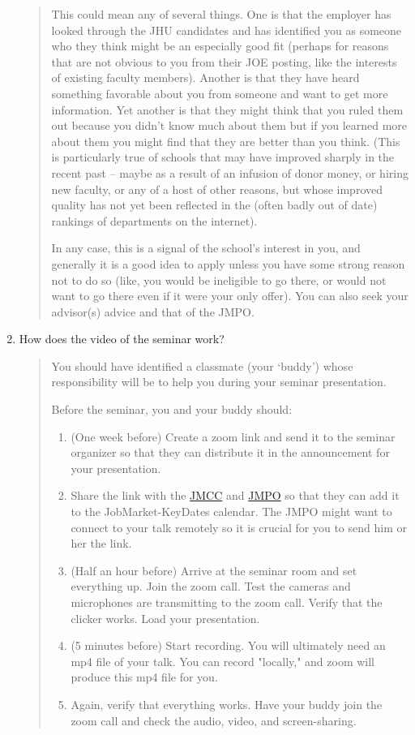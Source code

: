 \documentclass{\classes/econtex}
\begin{document}
\begin{enumerate}
  \begin{quote}
    This could mean any of several things.  One is that the employer has looked through the JHU candidates and has identified you as someone who they think might be an especially good fit (perhaps for reasons that are not obvious to you from their JOE posting, like the interests of existing faculty members).  Another is that they have heard something favorable about you from someone and want to get more information.  Yet another is that they might think that you ruled them out because you didn't know much about them but if you learned more about them you might find that they are better than you think.  (This is particularly true of schools that may have improved sharply in the recent past -- maybe as a result of an infusion of donor money, or hiring new faculty, or any of a host of other reasons, but whose improved quality has not yet been reflected in the (often badly out of date) rankings of departments on the internet).

    In any case, this is a signal of the school's interest in you, and generally it is a good idea to apply unless you have some strong reason not to do so (like, you would be ineligible to go there, or would not want to go there even if it were your only offer).  You can also seek your advisor(s) advice and that of the JMPO.


  \end{quote}

\hypertarget{record-and-post-your-job-talk}{}
\item  How does the video of the seminar work?
  
  \begin{quote}
    You should have identified a classmate (your `buddy') whose
    responsibility will be to help you during your seminar presentation.
    
    Before the seminar, you and your buddy should:
    \begin{enumerate}
    	\item (One week before) Create a zoom link and send it to the seminar organizer so that they can distribute it in the announcement for your presentation.
    	\item Share the link with the \href{\Notationpage}{JMCC} and \href{\Notationpage}{JMPO} so that they can add it to the JobMarket-KeyDates calendar. The JMPO might want to connect to your talk remotely so it is crucial for you to send him or her the link.
    	\item (Half an hour before) Arrive at the seminar room and set everything up. Join the zoom call. Test the cameras and microphones are transmitting to the zoom call. Verify that the clicker works. Load your presentation.
    	\item (5 minutes before) Start recording. You will ultimately need an mp4 file of your talk. You can record "locally," and zoom will produce this mp4 file for you.
    	\item Again, verify that everything works. Have your buddy join the zoom call and check the audio, video, and screen-sharing.
    \end{enumerate}
    

\end{quote}
\end{enumerate}
\end{document}
